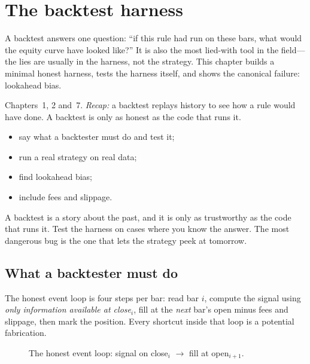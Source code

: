 \chapter{The backtest harness}\label{ch:backtest}

\noindent A backtest answers one question: ``if this rule had run on these bars, what would
the equity curve have looked like?'' It is also the most lied-with tool in the field---the
lies are usually in the harness, not the strategy. This chapter builds a minimal honest
harness, tests the harness itself, and shows the canonical failure: lookahead bias.

\begin{rulebox}
Chapters~1, 2 and~7. \emph{Recap:} a backtest replays history to see how a rule would have done. A backtest is only as honest as the code that runs it.
\end{rulebox}
\begin{wins}
\begin{itemize}
\item say what a backtester must do and test it;
\item run a real strategy on real data;
\item find lookahead bias;
\item include fees and slippage.
\end{itemize}
\end{wins}
\begin{principle}
A backtest is a story about the past, and it is only as trustworthy as the code that runs it. Test the harness on cases where you know the answer. The most dangerous bug is the one that lets the strategy peek at tomorrow.
\end{principle}

\section{What a backtester must do}\label{sec:harness}

The honest event loop is four steps per bar: read bar $i$, compute the signal using
\emph{only information available at close$_i$}, fill at the \emph{next} bar's open minus
fees and slippage, then mark the position. Every shortcut inside that loop is a potential
fabrication.

\begin{figure}[htbp]\centering

\caption{The honest event loop: signal on close$_i$ $\to$ fill at open$_{i+1}$.}
\label{fig:btflow}
\end{figure}


